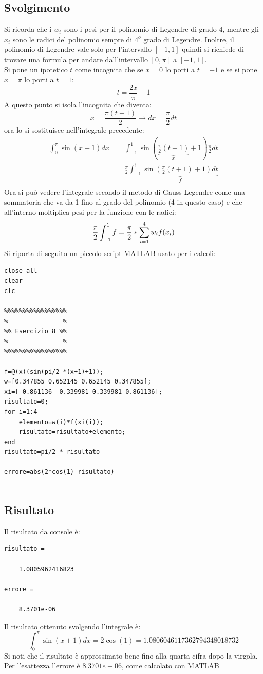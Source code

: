 \documentclass[11pt]{article}
\begin{document}
\subsection{Svolgimento}
Si ricorda che i $w_i$ sono i pesi per il polinomio di Legendre di grado 4, mentre gli $x_i$ sono le radici del polinomio sempre di $4^o$ grado di Legendre. 
Inoltre, il polinomio di Legendre vale solo per l'intervallo $[-1,1]$ quindi si richiede di trovare una formula per andare dall'intervallo $[0,\pi]$ a $[-1,1]$. \\
Si pone un ipotetico $t$ come incognita che se $x=0$ lo porti a $t=-1$ e se si pone $x=\pi$ lo porti a $t=1$:
\[
t=\frac{2x}{\pi}-1
\]
A questo punto si isola l'incognita che diventa:
\[
x=\frac{\pi (t+1)}{2}\to dx=\frac{\pi}{2}dt
\]
 ora lo si sostituisce nell'integrale precedente:
\begin{align*}
	\int_0^\pi{\sin(x+1) dx} &= \int_{-1}^{1}{\sin(\underbrace{\frac{\pi}{2}(t+1)}_x+1)\frac{\pi}{2}dt}\\
	&=\frac{\pi}{2}\int_{-1}^{1}\underbrace{\sin(\frac{\pi}{2}(t+1)+1)dt}_{f}\\	
\end{align*}
Ora si può vedere l'integrale secondo il metodo di Gauss-Legendre come una sommatoria che va da 1 fino al grado del polinomio (4 in questo caso) e che all'interno moltiplica pesi per la funzione con le radici:
\[
\frac{\pi}{2}\int_{-1}^{1}f\\=\frac{\pi}{2}* \sum_{i=1}^4w_if(x_i)
\]
Si riporta di seguito un piccolo script MATLAB usato per i calcoli:
\begin{lstlisting}
close all
clear
clc

%%%%%%%%%%%%%%%%%
%               %
%% Esercizio 8 %%
%               %
%%%%%%%%%%%%%%%%%

f=@(x)(sin(pi/2 *(x+1)+1));
w=[0.347855 0.652145 0.652145 0.347855];
xi=[-0.861136 -0.339981 0.339981 0.861136];
risultato=0;
for i=1:4
    elemento=w(i)*f(xi(i));
    risultato=risultato+elemento;
end
risultato=pi/2 * risultato

errore=abs(2*cos(1)-risultato)


\end{lstlisting}
\subsection{Risultato}
Il risultato da console è:
\begin{lstlisting}[style=console]
risultato =

    1.0805962416823
    
errore =

   	8.3701e-06
\end{lstlisting}
Il risultato ottenuto svolgendo l'integrale è:
\[
\int_0^\pi{\sin(x+1) dx}=2\cos(1)=1.0806046117362794348018732
\]
Si noti che il risultato è approssimato bene fino alla quarta cifra dopo la virgola. Per l'esattezza l'errore è $8.3701e-06$, come calcolato con MATLAB
\end{document}
